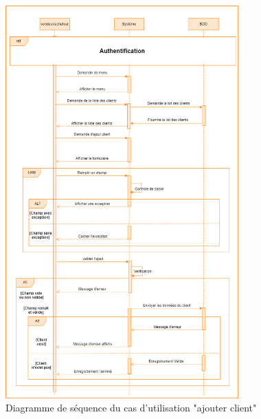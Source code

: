 \documentclass[edit,12pt,a4paper,ChapStyle,oneside,doubleinterligne]{report}
\begin{document}
\begin{figure}[h!]\label{fig:ajouter}
\centering
\includegraphics[width=0.8\textwidth]{images/seq ajouter client.png}
\caption{Diagramme de séquence du cas d'utilisation "ajouter client"}
\end{figure}

\clearpage
\end{document}
